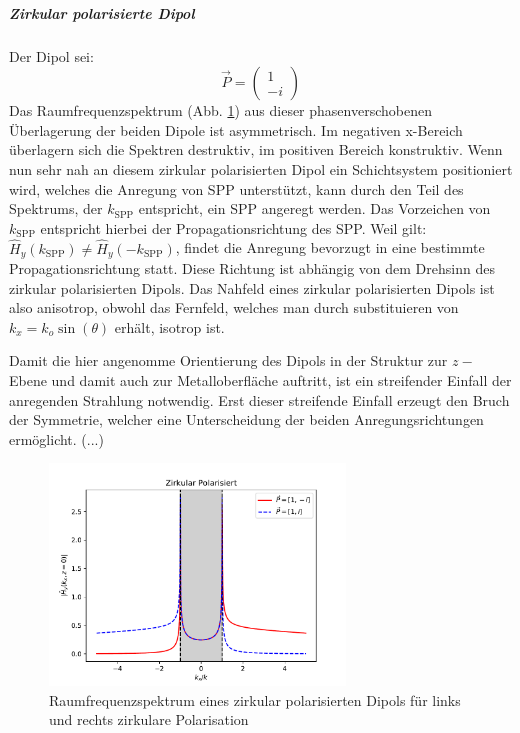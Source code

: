 \documentclass[titlepage]{article}
\begin{document}
	\subparagraph{Zirkular polarisierte Dipol}
	Der Dipol sei:
	$$\vec{P} = \begin{pmatrix} 1 \\ -i\end{pmatrix}$$
	Das Raumfrequenzspektrum (Abb. \ref{fig:spatial_spectrum_circ}) aus dieser phasenverschobenen Überlagerung der beiden Dipole ist asymmetrisch.  Im negativen x-Bereich überlagern sich die Spektren destruktiv, im positiven Bereich konstruktiv. Wenn nun sehr nah an diesem zirkular polarisierten Dipol ein Schichtsystem positioniert wird, welches die Anregung von SPP unterstützt, kann durch den Teil des Spektrums, der $k_{\mathrm{SPP}}$ entspricht, ein SPP angeregt werden. Das Vorzeichen von $k_{\mathrm{SPP}}$ entspricht hierbei der Propagationsrichtung des SPP. Weil gilt: $\hat{H}_y(k_{\mathrm{SPP}}) \neq \hat{H}_y( -k_{\mathrm{SPP}}) $, findet die Anregung bevorzugt in eine bestimmte Propagationsrichtung statt. Diese Richtung ist abhängig von dem Drehsinn des zirkular polarisierten Dipols.			
	Das Nahfeld eines zirkular polarisierten Dipols ist also anisotrop, obwohl das Fernfeld, welches man durch substituieren von $k_x = k_o \sin(\theta)$ erhält, isotrop ist.
	
	Damit die hier angenomme Orientierung des Dipols in der Struktur zur $z-$Ebene und damit auch zur Metalloberfläche auftritt, ist ein streifender Einfall der anregenden Strahlung notwendig. Erst dieser streifende Einfall erzeugt den Bruch der Symmetrie, welcher eine Unterscheidung der beiden Anregungsrichtungen ermöglicht. (...)
	\begin{figure}[h]
		\centering
		\includegraphics[width=0.7\textwidth]{figures/spatial_spectrum_circ.pdf}
		\caption{Raumfrequenzspektrum eines zirkular polarisierten Dipols für links und rechts zirkulare Polarisation}
		\label{fig:spatial_spectrum_circ}
	\end{figure}	
	
\end{document}
